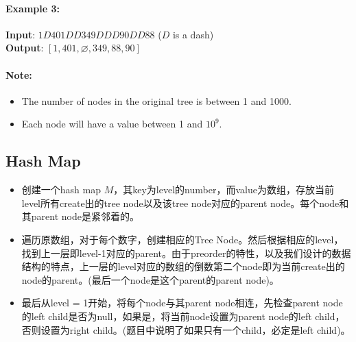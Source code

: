 \paragraph{Example 3:}
\begin{flushleft}
\begin{figure}[H]
\end{figure}
\textbf{Input}: $1D401DD349DDD90DD88$ ($ D $ is a dash)
\\
\textbf{Output}: $[1,401,\varnothing,349,88,90]$
\end{flushleft}

\paragraph{Note:}

\begin{itemize}
\item The number of nodes in the original tree is between 1 and 1000. 
\item Each node will have a value between 1 and $ 10^9 $.
\end{itemize}

\subsection{Hash Map}
\begin{itemize}
\item 创建一个hash map $M$，其key为level的number，而value为数组，存放当前level所有create出的tree node以及该tree node对应的parent node。每个node和其parent node是紧邻着的。
\item 遍历原数组，对于每个数字，创建相应的Tree Node。然后根据相应的level，找到上一层即level-1对应的parent。由于preorder的特性，以及我们设计的数据结构的特点，上一层的level对应的数组的倒数第二个node即为当前create出的node的parent。(最后一个node是这个parent的parent node)。
\item 最后从level = 1开始，将每个node与其parent node相连，先检查parent node的left child是否为null，如果是，将当前node设置为parent node的left child，否则设置为right child。(题目中说明了如果只有一个child，必定是left child)。
\end{itemize}

